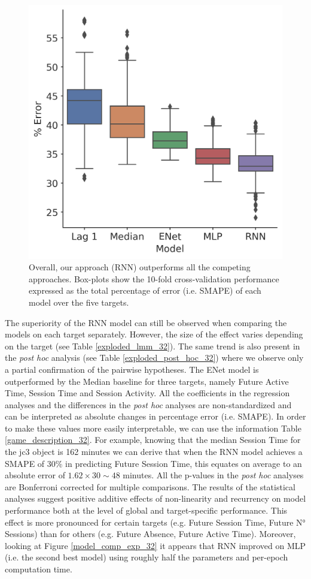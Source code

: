 \begin{figure}[h]
\centering
\includegraphics[width=.5\columnwidth]{images/chapter_3/performance_collapsed_32.png}
\caption[\textbf{Aggregated comparison of model performance}]{ Overall, our approach (RNN) outperforms all the competing approaches. Box-plots show the 10-fold cross-validation performance expressed as the total percentage of error (i.e. SMAPE) of each model over the five targets.}
\label{model_comp_coll_32} 
\end{figure}


The superiority of the RNN model can still be observed when comparing the models on each target separately. However, the size of the effect varies depending on the target (see Table \ref{exploded_lmm_32}). The same trend is also present in the \textit{post hoc} analysis (see Table \ref{exploded_post_hoc_32}) where we observe only a partial confirmation of the pairwise hypotheses. The ENet model is outperformed by the Median baseline for three targets, namely Future Active Time, Session Time and Session Activity. All the coefficients in the regression analyses and the differences in the \textit{post hoc} analyses are non-standardized and can be interpreted as absolute changes in percentage error (i.e. SMAPE). In order to make these values more easily interpretable, we can use the information Table \ref{game_description_32}. For example, knowing that the median Session Time for the jc3 object is 162 minutes we can derive that when the RNN model achieves a SMAPE of 30\% in predicting Future Session Time, this equates on average to an absolute error of $1.62 \times 30 \sim 48$ minutes. All the p-values in the \textit{post hoc} analyses are Bonferroni corrected for multiple comparisons. The results of the statistical analyses suggest positive additive effects of non-linearity and recurrency on model performance both at the level of global and target-specific performance. This effect is more pronounced for certain targets (e.g. Future Session Time, Future N° Sessions) than for others (e.g. Future Absence, Future Active Time). Moreover, looking at Figure \ref{model_comp_exp_32} it appears that RNN improved on MLP (i.e. the second best model) using roughly half the parameters and per-epoch computation time. 
